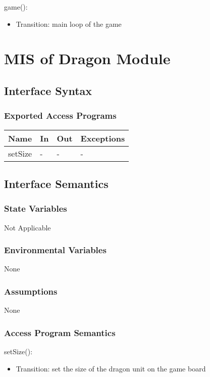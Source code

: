 \documentclass[12,english]{article}
\begin{document}
\noindent game():
\begin{itemize}
    \item Transition: main loop of the game
\end{itemize}



\section{MIS of Dragon Module}
\subsection{Interface Syntax}
\subsubsection{Exported Access Programs}
\begin{table}[h!]
    \centering
    \begin{tabular}{|p{4cm}|p{2cm}|p{2cm}|p{2cm}|}
    \hline
    \textbf {Name}  & {In} & {Out} & {Exceptions} \\
    \hline
    setSize & - & - & -\\
    \hline 
    \end{tabular}
\end{table}
\subsection{Interface Semantics}
\subsubsection{State Variables}
Not Applicable 
\subsubsection{Environmental Variables}
None
\subsubsection{Assumptions}
None
\subsubsection{Access Program Semantics}

\noindent setSize():
\begin{itemize}
    \item Transition: set the size of the dragon unit on the game board
\end{itemize}
\end{document}
